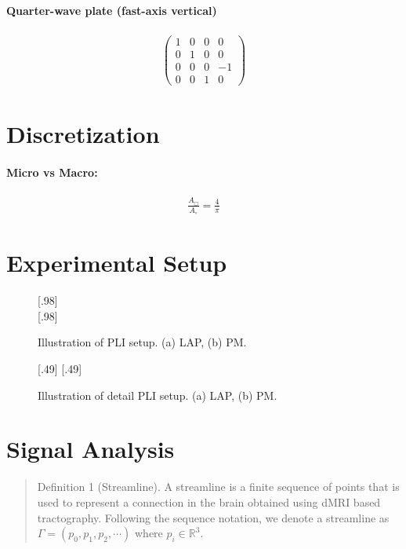 \paragraph{Quarter-wave plate (fast-axis vertical)}
\begin{align}
\begin{pmatrix}
    1 & 0 & 0 &  0 \\
    0 & 1 & 0 &  0 \\
    0 & 0 & 0 & -1 \\
    0 & 0 & 1 &  0
\end{pmatrix}
\end{align}
% 
\section{Discretization}
\paragraph{Micro vs Macro:}
% 
\begin{align}
    \frac{A_{\Box}}{A_{\circ}} = \frac{4}{\pi}
\end{align}
% 
\section{Experimental Setup}
%
\begin{figure}[!tb]
	\centering
	\subcaptionbox{}[.98\textwidth]{
		}\\[1cm]
	\subcaptionbox{}[.98\textwidth]{
		}
	\label{fig:pli_setup}
	\caption{Illustration of PLI setup. (a) LAP, (b) PM.}
\end{figure}
%
\begin{figure}[!tb]
	\centering
	\subcaptionbox{}[.49\textwidth]{
    }
	\subcaptionbox{}[.49\textwidth]{
    }
	\label{fig:pli_detail}
	\caption{Illustration of detail PLI setup. (a) LAP, (b) PM.}
\end{figure}
%
% 
\section{Signal Analysis}
% 
\begin{quote}
Definition 1 (Streamline). A streamline is a finite sequence of points that is used to represent a connection in the brain obtained using dMRI based tractography. Following the sequence notation, we denote a streamline as $\Gamma = (p_0, p_1, p_2, \cdots )$ where $p_i \in \mathbb{R}^3$. %
\end{quote}

